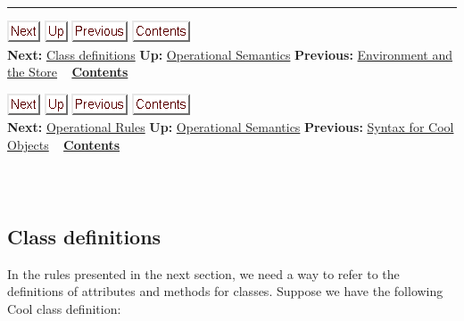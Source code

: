 \documentclass[]{article}
\begin{document}
\begin{center}\rule{3in}{0.4pt}\end{center}

\href{node47.html}{\includegraphics{next.png}}
\href{node44.html}{\includegraphics{up.png}}
\href{node45.html}{\includegraphics{prev.png}}
\href{node1.html}{\includegraphics{contents.png}} \\ \textbf{Next:}
\href{node47.html}{Class definitions} \textbf{Up:}
\href{node44.html}{Operational Semantics} \textbf{Previous:}
\href{node45.html}{Environment and the Store} ~
\textbf{\href{node1.html}{Contents}}

\href{node48.html}{\includegraphics{next.png}}
\href{node44.html}{\includegraphics{up.png}}
\href{node46.html}{\includegraphics{prev.png}}
\href{node1.html}{\includegraphics{contents.png}} \\ \textbf{Next:}
\href{node48.html}{Operational Rules} \textbf{Up:}
\href{node44.html}{Operational Semantics} \textbf{Previous:}
\href{node46.html}{Syntax for Cool Objects} ~
\textbf{\href{node1.html}{Contents}} \\ \\

\subsection{\\ Class definitions}

In the rules presented in the next section, we need a way to refer to
the definitions of attributes and methods for classes. Suppose we have
the following Cool class definition:
\end{document}
